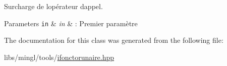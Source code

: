 Surcharge de l\textquotesingle{}opérateur d\textquotesingle{}appel. 


\begin{DoxyParams}[1]{Parameters}
\mbox{\tt in}  & {\em in} & \+: Premier paramètre \\
\hline
\end{DoxyParams}


The documentation for this class was generated from the following file\+:\begin{DoxyCompactItemize}
\item 
libs/mingl/tools/\hyperlink{ifonctorunaire_8hpp}{ifonctorunaire.\+hpp}\end{DoxyCompactItemize}
